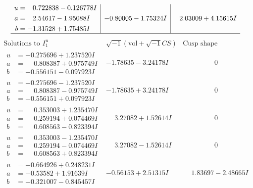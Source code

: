 \documentclass[1p]{elsarticle_modified}
\theoremstyle{definition}
\newcommand{\I}{\sqrt{-1}}
\begin{document}
$$\begin{array}{c|c|c}
\begin{aligned}
u &= \phantom{-}0.722838 - 0.126778 I \\
a &= \phantom{-}2.54617 - 1.95088 I \\
b &= -1.31528 + 1.75485 I\end{aligned}
 & -0.80005 - 1.75324 I & \phantom{-}2.03009 + 4.15615 I\\
 \hline 
 \end{array}$$\newpage$$\begin{array}{c|c|c}  
\text{Solutions to }I^u_{1}& \I (\text{vol} + \sqrt{-1}CS) & \text{Cusp shape}\\
 \hline 
\begin{aligned}
u &= -0.275696 + 1.237520 I \\
a &= \phantom{-}0.808387 + 0.975749 I \\
b &= -0.556151 - 0.097923 I\end{aligned}
 & -1.78635 - 3.24178 I & \phantom{-0.000000 } 0 \\ \hline\begin{aligned}
u &= -0.275696 - 1.237520 I \\
a &= \phantom{-}0.808387 - 0.975749 I \\
b &= -0.556151 + 0.097923 I\end{aligned}
 & -1.78635 + 3.24178 I & \phantom{-0.000000 } 0 \\ \hline\begin{aligned}
u &= \phantom{-}0.353003 + 1.235470 I \\
a &= \phantom{-}0.259194 + 0.074469 I \\
b &= \phantom{-}0.608563 - 0.823394 I\end{aligned}
 & \phantom{-}3.27082 + 1.52614 I & \phantom{-0.000000 } 0 \\ \hline\begin{aligned}
u &= \phantom{-}0.353003 - 1.235470 I \\
a &= \phantom{-}0.259194 - 0.074469 I \\
b &= \phantom{-}0.608563 + 0.823394 I\end{aligned}
 & \phantom{-}3.27082 - 1.52614 I & \phantom{-0.000000 } 0 \\ \hline\begin{aligned}
u &= -0.664926 + 0.248231 I \\
a &= -0.53582 + 1.91639 I \\
b &= -0.321007 - 0.845457 I\end{aligned}
 & -0.56153 + 2.51315 I & \phantom{-}1.83697 - 2.48665 I \\ \hline\begin{aligned}

\end{aligned}
\end{array}$$
\end{document}
